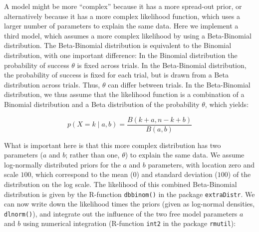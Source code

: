 \documentclass[12pt,]{krantz}
\theoremstyle{definition}
\theoremstyle{definition}
\theoremstyle{definition}
\theoremstyle{remark}
\begin{document}
A model might be more ``complex'' because it has a more spread-out
prior, or alternatively because it has a more complex likelihood
function, which uses a larger number of parameters to explain the same
data. Here we implement a third model, which assumes a more complex
likelihood by using a Beta-Binomial distribution. The Beta-Binomial
distribution is equivalent to the Binomial distribution, with one
important difference: In the Binomial distribution the probability of
success \(\theta\) is fixed across trials. In the Beta-Binomial
distribution, the probability of success is fixed for each trial, but is
drawn from a Beta distribution across trials. Thus, \(\theta\) can
differ between trials. In the Beta-Binomial distribution, we thus assume
that the likelihood function is a combination of a Binomial distribution
and a Beta distribution of the probability \(\theta\), which yields:

\begin{equation}
p(X = k \mid a, b) = \frac{B(k+a, n-k+b)}{B(a,b)}
\end{equation}

What is important here is that this more complex distribution has two
parameters (\(a\) and \(b\); rather than one, \(\theta\)) to explain the
same data. We assume log-normally distributed priors for the \(a\) and
\(b\) parameters, with location zero and scale \(100\), which correspond
to the mean (\(0\)) and standard deviation (\(100\)) of the distribution
on the log scale. The likelihood of this combined Beta-Binomial
distribution is given by the R-function \texttt{dbbinom()} in the
package \texttt{extraDistr}. We can now write down the likelihood times
the priors (given as log-normal densities, \texttt{dlnorm()}), and
integrate out the influence of the two free model parameters \(a\) and
\(b\) using numerical integration (R-function \texttt{int2} in the
package \texttt{rmutil}):
\end{document}

